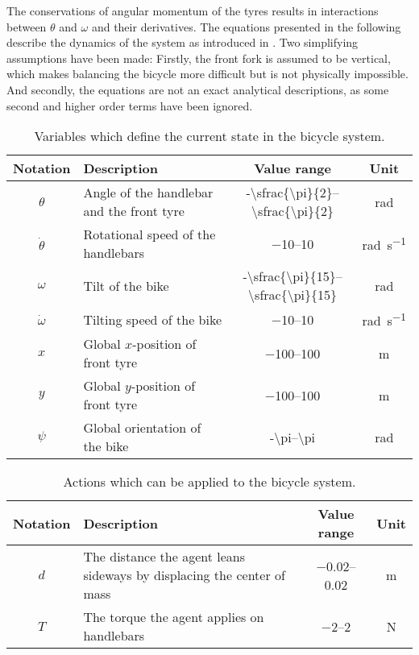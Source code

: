The conservations of angular momentum of the tyres results in interactions between $\theta$ and $\omega$ and their derivatives.
The equations presented in the following describe the dynamics of the system as introduced in \cite{randlov_learning_1998}.
Two simplifying assumptions have been made:
Firstly, the front fork is assumed to be vertical, which makes balancing the bicycle more difficult but is not physically impossible.
And secondly, the equations are not an exact analytical descriptions, as some second and higher order terms have been ignored.
\begin{table}[p]
    \centering
    \caption{Variables which define the current state in the bicycle system.}
    \label{tab:bicycle_variables}
    \begin{tabularx}{\tablewidth}{cXcc}
        \toprule
        Notation & Description & Value range & Unit \\
        \midrule
        $\theta$ & Angle of the handlebar and the front tyre & \numrange[parse-numbers=false]{-\sfrac{\pi}{2}}{\sfrac{\pi}{2}} & \si{\radian} \\
        $\dot{\theta}$ & Rotational speed of the handlebars & \numrange{-10}{10} & \si{\radian\per\second} \\
        $\omega$ & Tilt of the bike & \numrange[parse-numbers=false]{-\sfrac{\pi}{15}}{\sfrac{\pi}{15}} & \si{\radian} \\
        $\dot{\omega}$ & Tilting speed of the bike & \numrange{-10}{10} & \si{\radian\per\second} \\
        $x$ & Global $x$-position of front tyre & \numrange{-100}{100} & \si{\metre} \\
        $y$ & Global $y$-position of front tyre & \numrange{-100}{100} & \si{\metre} \\
        $\psi$ & Global orientation of the bike & \numrange[parse-numbers=false]{-\pi}{\pi} & \si{\radian} \\
        \bottomrule
    \end{tabularx}
\end{table}
\begin{table}[p]
    \centering
    \caption{Actions which can be applied to the bicycle system.}
    \label{tab:bicycle_actions}
    \begin{tabularx}{\tablewidth}{cXcc}
        \toprule
        Notation & Description & Value range & Unit \\
        \midrule
        $d$ & The distance the agent leans sideways by displacing the center of mass & \numrange{-0.02}{0.02} & \si{\metre} \\
        $T$ & The torque the agent applies on handlebars & \numrange{-2}{2} & \si{\N} \\
        \bottomrule
    \end{tabularx}
\end{table}
